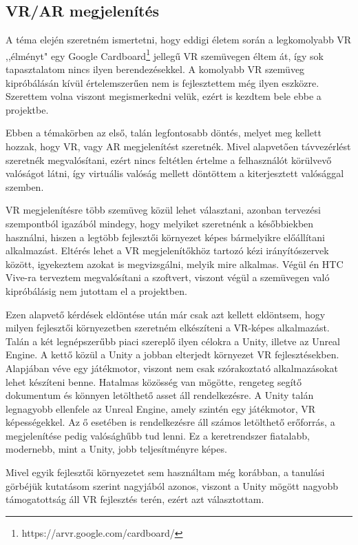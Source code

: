 \documentclass[11pt,a4paper,oneside]{article}
\begin{document}
\subsection{VR/AR megjelenítés}

A téma elején szeretném ismertetni, hogy eddigi életem során a legkomolyabb VR ,,élményt" egy Google Cardboard\footnote{https://arvr.google.com/cardboard/} jellegű VR szemüvegen éltem át, így sok tapasztalatom nincs ilyen berendezésekkel. A komolyabb VR szemüveg kipróbálásán kívül értelemszerűen nem is fejlesztettem még ilyen eszközre. Szerettem volna viszont megismerkedni velük, ezért is kezdtem bele ebbe a projektbe.

Ebben a témakörben az első, talán legfontosabb döntés, melyet meg kellett hozzak, hogy VR, vagy AR megjelenítést szeretnék. Mivel alapvetően távvezérlést szeretnék megvalósítani, ezért nincs feltétlen értelme a felhasználót körülvevő valóságot látni, így virtuális valóság mellett döntöttem a kiterjesztett valósággal szemben.

VR megjelenítésre több szemüveg közül lehet választani, azonban tervezési szempontból igazából mindegy, hogy melyiket szeretnénk a későbbiekben használni, hiszen a legtöbb fejlesztői környezet képes bármelyikre előállítani alkalmazást. Eltérés lehet a VR megjelenítőkhöz tartozó kézi irányítószervek között, igyekeztem azokat is megvizsgálni, melyik mire alkalmas. Végül én HTC Vive-ra terveztem megvalósítani a szoftvert, viszont végül a szemüvegen való kipróbálásig nem jutottam el a projektben.

Ezen alapvető kérdések eldöntése után már csak azt kellett eldöntsem, hogy milyen fejlesztői környezetben szeretném elkészíteni a VR-képes alkalmazást. Talán a két legnépszerűbb piaci szereplő ilyen célokra a Unity, illetve az Unreal Engine. A kettő közül a Unity a jobban elterjedt környezet VR fejlesztésekben. Alapjában véve egy játékmotor, viszont nem csak szórakoztató alkalmazásokat lehet készíteni benne. Hatalmas közösség van mögötte, rengeteg segítő dokumentum és könnyen letölthető asset áll rendelkezésre. A Unity talán legnagyobb ellenfele az Unreal Engine, amely szintén egy játékmotor, VR képességekkel. Az ő esetében is rendelkezésre áll számos letölthető erőforrás, a megjelenítése pedig valósághűbb tud lenni. Ez a keretrendszer fiatalabb, modernebb, mint a Unity, jobb teljesítményre képes.

Mivel egyik fejlesztői környezetet sem használtam még korábban, a tanulási görbéjük kutatásom szerint nagyjából azonos, viszont a Unity mögött nagyobb támogatottság áll VR fejlesztés terén, ezért azt választottam.
\end{document}
